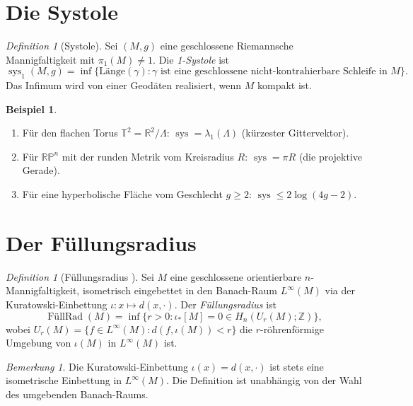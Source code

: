 \documentclass[12pt,a4paper]{amsart}
\theoremstyle{definition}
\newtheorem{example}[theorem]{Beispiel}
\theoremstyle{remark}
\newtheorem{bemerkung}[theorem]{Bemerkung}
\newtheorem{definition_de}[theorem]{Definition}
\DeclareMathOperator{\sys}{sys}
\DeclareMathOperator{\FillRad}{FüllRad}
\newcommand{\RR}{\mathbb{R}}
\newcommand{\ZZ}{\mathbb{Z}}
\newcommand{\RP}{\mathbb{RP}}
\newcommand{\TT}{\mathbb{T}}
\begin{document}
\section{Die Systole}

\begin{definition_de}[Systole]
Sei $(M,g)$ eine geschlossene Riemannsche Mannigfaltigkeit mit
$\pi_1(M) \neq 1$.  Die \emph{1-Systole} ist
\[
  \sys_1(M,g) = \inf\bigl\{ \mathrm{Länge}(\gamma) :
    \gamma \text{ ist eine geschlossene nicht-kontrahierbare Schleife in } M
  \bigr\}.
\]
Das Infimum wird von einer Geodäten realisiert, wenn $M$ kompakt ist.
\end{definition_de}

\begin{example}
\begin{enumerate}[label=(\roman*)]
  \item Für den flachen Torus $\TT^2 = \RR^2/\Lambda$:
        $\sys = \lambda_1(\Lambda)$ (kürzester Gittervektor).
  \item Für $\RP^n$ mit der runden Metrik vom Kreisradius $R$:
        $\sys = \pi R$ (die projektive Gerade).
  \item Für eine hyperbolische Fläche vom Geschlecht $g \ge 2$:
        $\sys \le 2\log(4g-2)$.
\end{enumerate}
\end{example}

\section{Der Füllungsradius}

\begin{definition_de}[Füllungsradius \cite{Gromov1983}]
Sei $M$ eine geschlossene orientierbare $n$-Mannigfaltigkeit, isometrisch
eingebettet in den Banach-Raum $L^\infty(M)$ via der Kuratowski-Einbettung
$\iota \colon x \mapsto d(x,\cdot)$.  Der \emph{Füllungsradius} ist
\[
  \FillRad(M) = \inf\bigl\{ r > 0 : \iota_*[M] = 0 \in H_n(U_r(M);\ZZ)
  \bigr\},
\]
wobei $U_r(M) = \{f \in L^\infty(M) : d(f, \iota(M)) < r\}$ die
$r$-röhrenförmige Umgebung von $\iota(M)$ in $L^\infty(M)$ ist.
\end{definition_de}

\begin{bemerkung}
Die Kuratowski-Einbettung $\iota(x) = d(x,\cdot)$ ist stets eine isometrische
Einbettung in $L^\infty(M)$.  Die Definition ist unabhängig von der Wahl des
umgebenden Banach-Raums.
\end{bemerkung}
\end{document}
